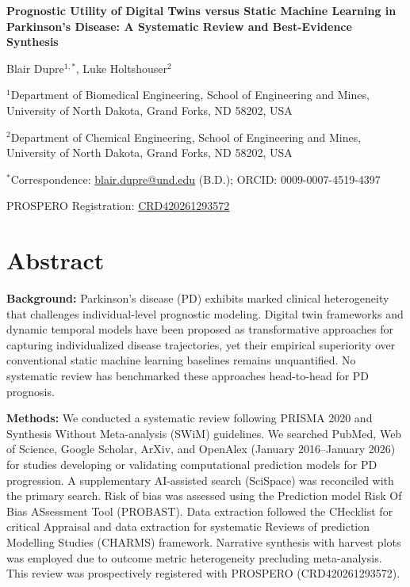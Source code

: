 \documentclass[11pt,a4paper]{article}
\begin{document}
\begin{center}
{\LARGE\bfseries Prognostic Utility of Digital Twins versus Static Machine Learning in Parkinson's Disease: A Systematic Review and Best-Evidence Synthesis}

\vspace{0.8cm}

{\large Blair Dupre$^{1,*}$, Luke Holtshouser$^{2}$}

\vspace{0.4cm}

{\small $^{1}$Department of Biomedical Engineering, School of Engineering and Mines, University of North Dakota, Grand Forks, ND 58202, USA}

{\small $^{2}$Department of Chemical Engineering, School of Engineering and Mines, University of North Dakota, Grand Forks, ND 58202, USA}

\vspace{0.3cm}

{\small $^{*}$Correspondence: \href{mailto:blair.dupre@und.edu}{blair.dupre@und.edu} (B.D.); ORCID: 0009-0007-4519-4397}

\vspace{0.3cm}

{\small PROSPERO Registration: \href{https://www.crd.york.ac.uk/PROSPERO/view/CRD420261293572}{CRD420261293572}}
\end{center}

\vspace{0.5cm}

\section*{Abstract}

\noindent\textbf{Background:}
Parkinson's disease (PD) exhibits marked clinical heterogeneity that challenges individual-level prognostic modeling. Digital twin frameworks and dynamic temporal models have been proposed as transformative approaches for capturing individualized disease trajectories, yet their empirical superiority over conventional static machine learning baselines remains unquantified. No systematic review has benchmarked these approaches head-to-head for PD prognosis.

\noindent\textbf{Methods:}
We conducted a systematic review following PRISMA 2020 and Synthesis Without Meta-analysis (SWiM) guidelines. We searched PubMed, Web of Science, Google Scholar, ArXiv, and OpenAlex (January 2016--January 2026) for studies developing or validating computational prediction models for PD progression. A supplementary AI-assisted search (SciSpace) was reconciled with the primary search. Risk of bias was assessed using the Prediction model Risk Of Bias ASsessment Tool (PROBAST). Data extraction followed the CHecklist for critical Appraisal and data extraction for systematic Reviews of prediction Modelling Studies (CHARMS) framework. Narrative synthesis with harvest plots was employed due to outcome metric heterogeneity precluding meta-analysis. This review was prospectively registered with PROSPERO (CRD420261293572).
\end{document}
